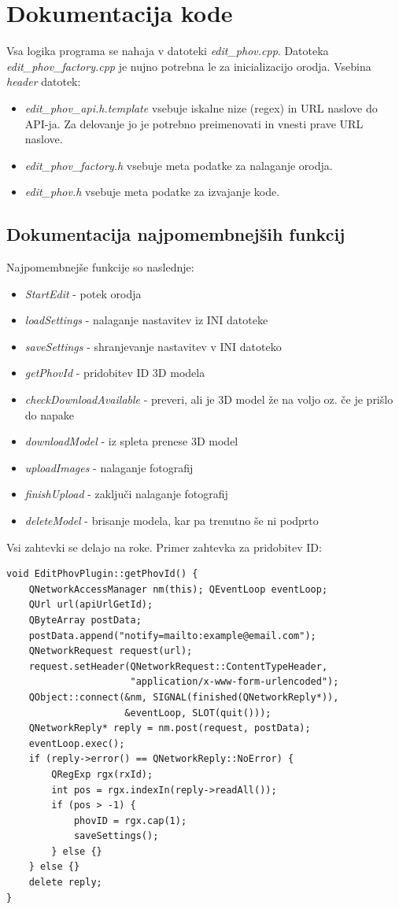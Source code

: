 \documentclass[11pt]{article}
\begin{document}
\section{Dokumentacija kode}
\label{sec-4}
Vsa logika programa se nahaja v datoteki \emph{edit\_phov.cpp}. Datoteka \emph{edit\_phov\_factory.cpp} je nujno potrebna le za inicializacijo orodja. 
Vsebina \emph{header} datotek:
\begin{itemize}
\item \emph{edit\_phov\_api.h.template} vsebuje iskalne nize (regex) in URL naslove do API-ja. Za delovanje jo je potrebno preimenovati in vnesti prave URL naslove.
\item \emph{edit\_phov\_factory.h} vsebuje meta podatke za nalaganje orodja.
\item \emph{edit\_phov.h} vsebuje meta podatke za izvajanje kode.
\end{itemize}

\subsection{Dokumentacija najpomembnejših funkcij}
\label{sec-4-1}
Najpomembnejše funkcije so naslednje:
\begin{itemize}
\item \emph{StartEdit} - potek orodja
\item \emph{loadSettings} - nalaganje nastavitev iz INI datoteke
\item \emph{saveSettings} - shranjevanje nastavitev v INI datoteko
\item \emph{getPhovId} - pridobitev ID 3D modela
\item \emph{checkDownloadAvailable} - preveri, ali je 3D model že na voljo oz. če je prišlo do napake
\item \emph{downloadModel} - iz spleta prenese 3D model
\item \emph{uploadImages} - nalaganje fotografij
\item \emph{finishUpload} - zaključi nalaganje fotografij
\item \emph{deleteModel} - brisanje modela, kar pa trenutno še ni podprto
\end{itemize}

Vsi zahtevki se delajo na roke. Primer zahtevka za pridobitev ID:
\begin{lstlisting}
void EditPhovPlugin::getPhovId() {
    QNetworkAccessManager nm(this); QEventLoop eventLoop;
    QUrl url(apiUrlGetId);
    QByteArray postData;
    postData.append("notify=mailto:example@email.com");
    QNetworkRequest request(url);    
    request.setHeader(QNetworkRequest::ContentTypeHeader, 
                      "application/x-www-form-urlencoded");
    QObject::connect(&nm, SIGNAL(finished(QNetworkReply*)),
                     &eventLoop, SLOT(quit()));
    QNetworkReply* reply = nm.post(request, postData);
    eventLoop.exec(); 
    if (reply->error() == QNetworkReply::NoError) {
        QRegExp rgx(rxId);
        int pos = rgx.indexIn(reply->readAll());
        if (pos > -1) {
            phovID = rgx.cap(1);
            saveSettings();
        } else {}
    } else {}
    delete reply;
}
\end{lstlisting}
\end{document}
